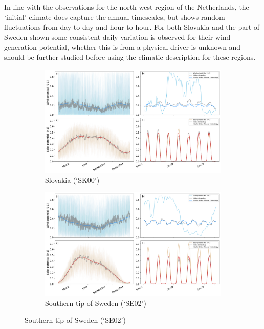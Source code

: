 \documentclass[a4paper,11pt]{extarticle}
\begin{document}
In line with the observations for the north-west region of the Netherlands, the `initial' climate does capture the annual timescales, but shows random fluctuations from day-to-day and hour-to-hour. 
For both Slovakia and the part of Sweden shown some consistent daily variation is observed for their wind generation potential, whether this is from a physical driver is unknown and should be further studied before using the climatic description for these regions.

\begin{figure}[hb]
    \centering
    \begin{subfigure}[t]{\linewidth}
        \centering
        \includegraphics[width=\textwidth]{Climatology_v2_SK00}
        \caption{Slovakia (`SK00')}
    \end{subfigure}
    \begin{subfigure}[t]{\linewidth}
        \centering
        \includegraphics[width=\textwidth]{Climatology_v2_SE02}
        \caption{Southern tip of Sweden (`SE02')}
    \end{subfigure}

\end{figure}
\end{document}
